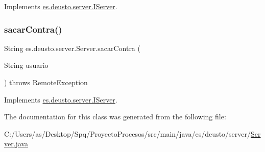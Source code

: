 Implements \mbox{\hyperlink{interfacees_1_1deusto_1_1server_1_1_i_server_af6743c655c7831fa6d87e6e910bb6db4}{es.\+deusto.\+server.\+I\+Server}}.

\mbox{\label{classes_1_1deusto_1_1server_1_1_server_aefe051d880626950ea2964d89a4ae3c3}} 
\subsubsection{\texorpdfstring{sacarContra()}{sacarContra()}}
{\footnotesize\ttfamily String es.\+deusto.\+server.\+Server.\+sacar\+Contra (\begin{DoxyParamCaption}\item[{String}]{usuario }\end{DoxyParamCaption}) throws Remote\+Exception}



Implements \mbox{\hyperlink{interfacees_1_1deusto_1_1server_1_1_i_server_a950b819a4f67edf0ef76221dd4714d47}{es.\+deusto.\+server.\+I\+Server}}.



The documentation for this class was generated from the following file\+:\begin{DoxyCompactItemize}
\item 
C\+:/\+Users/as/\+Desktop/\+Spq/\+Proyecto\+Procesos/src/main/java/es/deusto/server/\mbox{\hyperlink{_server_8java}{Server.\+java}}\end{DoxyCompactItemize}
